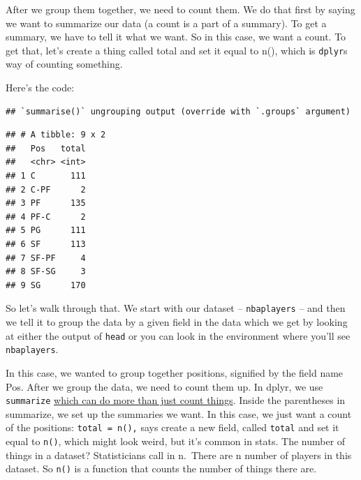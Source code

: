 \documentclass[
]{book}
\newenvironment{Shaded}{\begin{snugshade}}{\end{snugshade}}
\newcommand{\DataTypeTok}[1]{\textcolor[rgb]{0.13,0.29,0.53}{#1}}
\newcommand{\KeywordTok}[1]{\textcolor[rgb]{0.13,0.29,0.53}{\textbf{#1}}}
\newcommand{\NormalTok}[1]{#1}
\newcommand{\OperatorTok}[1]{\textcolor[rgb]{0.81,0.36,0.00}{\textbf{#1}}}
\newcommand{\StringTok}[1]{\textcolor[rgb]{0.31,0.60,0.02}{#1}}
\begin{document}
After we group them together, we need to count them. We do that first by saying we want to summarize our data (a count is a part of a summary). To get a summary, we have to tell it what we want. So in this case, we want a count. To get that, let's create a thing called total and set it equal to n(), which is \texttt{dplyr}s way of counting something.

Here's the code:

\begin{Shaded}
\end{Shaded}

\begin{verbatim}
## `summarise()` ungrouping output (override with `.groups` argument)
\end{verbatim}

\begin{verbatim}
## # A tibble: 9 x 2
##   Pos   total
##   <chr> <int>
## 1 C       111
## 2 C-PF      2
## 3 PF      135
## 4 PF-C      2
## 5 PG      111
## 6 SF      113
## 7 SF-PF     4
## 8 SF-SG     3
## 9 SG      170
\end{verbatim}

So let's walk through that. We start with our dataset -- \texttt{nbaplayers} -- and then we tell it to group the data by a given field in the data which we get by looking at either the output of \texttt{head} or you can look in the environment where you'll see \texttt{nbaplayers}.

In this case, we wanted to group together positions, signified by the field name Pos. After we group the data, we need to count them up. In dplyr, we use \texttt{summarize} \href{http://dplyr.tidyverse.org/reference/summarise.html}{which can do more than just count things}. Inside the parentheses in summarize, we set up the summaries we want. In this case, we just want a count of the positions: \texttt{total\ =\ n(),} says create a new field, called \texttt{total} and set it equal to \texttt{n()}, which might look weird, but it's common in stats. The number of things in a dataset? Statisticians call in n.~There are n number of players in this dataset. So \texttt{n()} is a function that counts the number of things there are.
\end{document}
